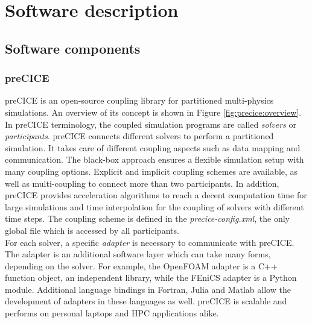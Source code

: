\section{Software description}
\label{section:software}

\subsection{Software components}

\subsubsection{preCICE}

preCICE \cite{Chourdakis:2022} is an open-source coupling library for partitioned multi-physics simulations. An overview of its concept is shown in Figure \ref{fig:precice:overview}. In preCICE terminology, the coupled simulation programs are called \textit{solvers} or \textit{participants}. preCICE connects different solvers to perform a partitioned simulation. It takes care of different coupling aspects such as data mapping and communication. The black-box approach ensures a flexible simulation setup \cite{Gatzhammer:2014} with many coupling options. Explicit and implicit coupling schemes are available, as well as multi-coupling to connect more than two participants. In addition, preCICE provides acceleration algorithms to reach a decent computation time for large simulations and time interpolation for the coupling of solvers with different time steps. The coupling scheme is defined in the \textit{precice-config.xml}, the only global file which is accessed by all participants.\\
For each solver, a specific \textit{adapter} is necessary to communicate with preCICE. The adapter is an additional software layer which can take many forms, depending on the solver. For example, the OpenFOAM adapter is a C++ function object, an independent library, while the FEniCS adapter is a Python module. Additional language bindings in Fortran, Julia and Matlab allow the development of adapters in these languages as well. preCICE is scalable and performs on personal laptops and HPC applications alike.

